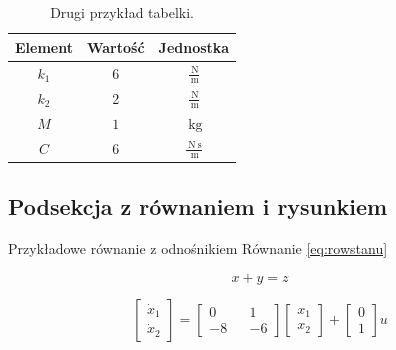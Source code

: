 \documentclass{sprawozdanie-agh}
\begin{document}
    

    \begin{table}[h!]
    \begin{center}
    \begin{tabular}{ c | c | c }
		 Element & Wartość & Jednostka \\ 
		 \hline\hline
		 $k_1$ & 6 & $\frac{\qty[per-mode = symbol]{}{\newton }}{\qty[per-mode = symbol]{}{\meter }}$ \\ 
		 \hline
		 $k_2$ & 2 & $\frac{\qty[per-mode = symbol]{}{\newton }}{\qty[per-mode = symbol]{}{\meter }}$ \\ 
		 \hline
		 $M$ & $1$ & $\qty[per-mode = symbol]{}{\kilogram}$ \\
		 \hline
		 $C$ & $6$ & $\frac{\qty[per-mode = symbol]{}{\newton }\qty[per-mode = symbol]{}{\second }}{\qty[per-mode = symbol]{}{\meter }}$ \\
    \end{tabular}
    \caption{Drugi przykład tabelki.}\label{tab2}
    \end{center}
    \end{table}
    
    

\subsection{Podsekcja z równaniem i rysunkiem}
    Przykładowe równanie z odnośnikiem Równanie \ref{eq:rowstanu}
    
    \begin{equation}
    x + y = z
    \label{eq:rowstanu}
    \end{equation}

    \begin{equation} 
    \label{eqn_state2}
        \begin{bmatrix} 
            \dot{x}_1 \\  \dot{x}_2 
        \end{bmatrix} = 
        \begin{bmatrix} 0 && 1 \\ 
                        -8 && -6
        \end{bmatrix}
        \begin{bmatrix} 
            {x}_1 \\  {x}_2 
        \end{bmatrix} +
        \begin{bmatrix} 
            0 \\  1 
        \end{bmatrix} u
    \end{equation}
\end{document}
